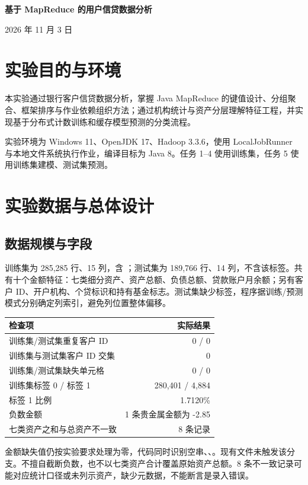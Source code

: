 \documentclass[UTF8,a4paper,zihao=5,fontset=none]{ctexart}
\newcommand{\code}[1]{\texttt{\detokenize{#1}}}
\begin{document}
\begin{center}
{\LARGE\bfseries 基于 MapReduce 的用户信贷数据分析\par}
\vspace{0.4em}{\large 实验 2 实验报告\par}
\vspace{0.4em}2026 年 11 月 3 日
\end{center}
\section{实验目的与环境}
本实验通过银行客户信贷数据分析，掌握 Java MapReduce 的键值设计、分组聚合、框架排序与作业依赖组织方法；通过机构统计与资产分层理解特征工程，并实现基于分布式计数训练和缓存模型预测的分类流程。

实验环境为 Windows 11、OpenJDK 17、Hadoop 3.3.6，使用 LocalJobRunner 与本地文件系统执行作业，编译目标为 Java 8。任务 1--4 使用训练集，任务 5 使用训练集建模、测试集预测。
\section{实验数据与总体设计}
\subsection{数据规模与字段}
训练集为 285,285 行、15 列，含 \code{bad_good}；测试集为 189,766 行、14 列，不含该标签。共有十个金额特征：七类细分资产、资产总额、负债总额、贷款账户月余额；另有客户 ID、开户机构、个贷标识和持有基金标志。测试集缺少标签，程序据训练/预测模式分别确定列索引，避免列位置整体偏移。

\begin{table}[H]\centering
\begin{tabular}{l r}\toprule 检查项 & 实际结果\\\midrule
训练集/测试集重复客户 ID & 0 / 0\\
训练集与测试集客户 ID 交集 & 0\\
训练集/测试集缺失单元格 & 0 / 0\\
训练集标签 0 / 标签 1 & 280,401 / 4,884\\
标签 1 比例 & 1.7120\%\\
负数金额 & 1 条贵金属金额为 -2.85\\
七类资产之和与总资产不一致 & 8 条记录\\\bottomrule
\end{tabular}
\end{table}

金额缺失值仍按实验要求处理为零，代码同时识别空串、\code{NaN}、\code{null}。现有文件未触发该分支。不擅自截断负数，也不以七类资产合计覆盖原始资产总额。8 条不一致记录可能对应统计口径或未列示资产，缺少元数据，不能断言是录入错误。
\end{document}
